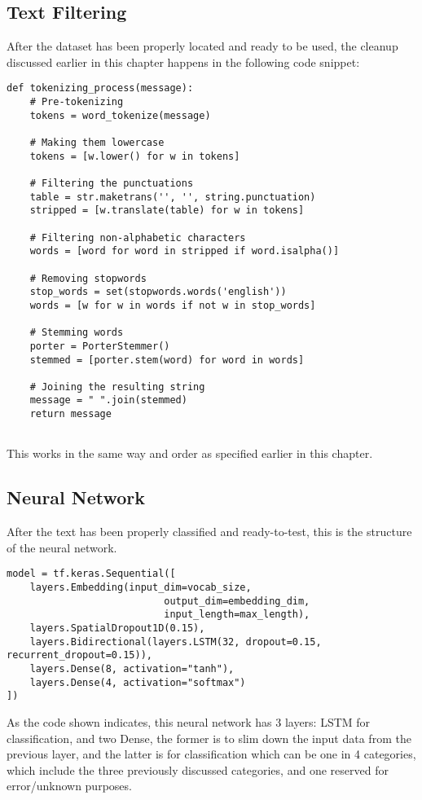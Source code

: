 \subsection{Text Filtering}
After the dataset has been properly located and ready to be used, the cleanup discussed earlier in this chapter happens in the following code snippet:
\begin{lstlisting}
def tokenizing_process(message):
    # Pre-tokenizing
    tokens = word_tokenize(message)
    
    # Making them lowercase
    tokens = [w.lower() for w in tokens]
    
    # Filtering the punctuations
    table = str.maketrans('', '', string.punctuation)
    stripped = [w.translate(table) for w in tokens]
    
    # Filtering non-alphabetic characters
    words = [word for word in stripped if word.isalpha()]
    
    # Removing stopwords
    stop_words = set(stopwords.words('english'))
    words = [w for w in words if not w in stop_words]
    
    # Stemming words
    porter = PorterStemmer()
    stemmed = [porter.stem(word) for word in words]
    
    # Joining the resulting string
    message = " ".join(stemmed)
    return message
    
\end{lstlisting}
This works in the same way and order as specified earlier in this chapter.
\subsection{Neural Network}
After the text has been properly classified and ready-to-test, this is the structure of the neural network.
\begin{lstlisting}
model = tf.keras.Sequential([
    layers.Embedding(input_dim=vocab_size, 
                           output_dim=embedding_dim, 
                           input_length=max_length),
    layers.SpatialDropout1D(0.15),
    layers.Bidirectional(layers.LSTM(32, dropout=0.15,
recurrent_dropout=0.15)),
    layers.Dense(8, activation="tanh"),
    layers.Dense(4, activation="softmax")
])
\end{lstlisting}
As the code shown indicates, this neural network has 3 layers: LSTM for classification, and two Dense, the former is to slim down the input data from the previous layer, and the latter is for classification which can be one in 4 categories, which include the three previously discussed categories, and one reserved for error/unknown purposes.
